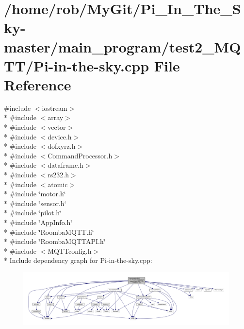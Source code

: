 \hypertarget{test2___m_q_t_t_2_pi-in-the-sky_8cpp}{}\section{/home/rob/\+My\+Git/\+Pi\+\_\+\+In\+\_\+\+The\+\_\+\+Sky-\/master/main\+\_\+program/test2\+\_\+\+M\+Q\+T\+T/\+Pi-\/in-\/the-\/sky.cpp File Reference}
\label{test2___m_q_t_t_2_pi-in-the-sky_8cpp}
{\ttfamily \#include $<$iostream$>$}\\*
{\ttfamily \#include $<$array$>$}\\*
{\ttfamily \#include $<$vector$>$}\\*
{\ttfamily \#include $<$device.\+h$>$}\\*
{\ttfamily \#include $<$dofxyrz.\+h$>$}\\*
{\ttfamily \#include $<$Command\+Processor.\+h$>$}\\*
{\ttfamily \#include $<$dataframe.\+h$>$}\\*
{\ttfamily \#include $<$rs232.\+h$>$}\\*
{\ttfamily \#include $<$atomic$>$}\\*
{\ttfamily \#include \char`\"{}motor.\+h\char`\"{}}\\*
{\ttfamily \#include \char`\"{}sensor.\+h\char`\"{}}\\*
{\ttfamily \#include \char`\"{}pilot.\+h\char`\"{}}\\*
{\ttfamily \#include \char`\"{}App\+Info.\+h\char`\"{}}\\*
{\ttfamily \#include \char`\"{}Roomba\+M\+Q\+T\+T.\+h\char`\"{}}\\*
{\ttfamily \#include \char`\"{}Roomba\+M\+Q\+T\+T\+A\+P\+I.\+h\char`\"{}}\\*
{\ttfamily \#include $<$M\+Q\+T\+Tconfig.\+h$>$}\\*
Include dependency graph for Pi-\/in-\/the-\/sky.cpp\+:\nopagebreak
\begin{figure}[H]
\begin{center}
\leavevmode
\includegraphics[width=350pt]{test2___m_q_t_t_2_pi-in-the-sky_8cpp__incl}
\end{center}
\end{figure}
